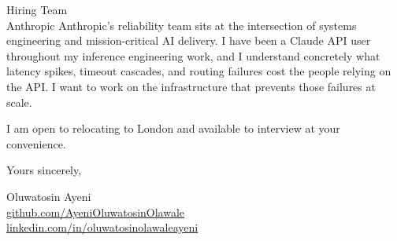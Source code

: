\documentclass[12pt,a4paper]{letter}
\begin{document}
\begin{letter}{Hiring Team \\ Anthropic}
Anthropic's reliability team sits at the intersection of systems engineering and mission-critical AI delivery. I have been a Claude API user throughout my inference engineering work, and I understand concretely what latency spikes, timeout cascades, and routing failures cost the people relying on the API. I want to work on the infrastructure that prevents those failures at scale.

I am open to relocating to London and available to interview at your convenience.

\closing{Yours sincerely,}

Oluwatosin Ayeni \\
\href{https://github.com/AyeniOluwatosinOlawale}{github.com/AyeniOluwatosinOlawale} \\
\href{https://www.linkedin.com/in/oluwatosinolawaleayeni/}{linkedin.com/in/oluwatosinolawaleayeni}

\end{letter}
\end{document}
